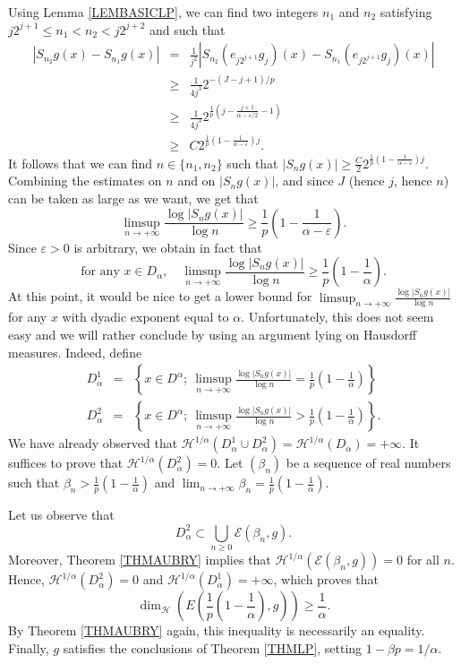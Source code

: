 \documentclass[11pt,a4paper]{amsart}
\theoremstyle{plain}
\begin{document}
Using Lemma \ref{LEMBASICLP}, we can find two integers $n_1$ and $n_2$
satisfying  $j2^{j+1}\le n_1< n_2< j2^{j+2}$ and such that
\begin{eqnarray*}
 |S_{n_2}g(x)-S_{n_1}g(x)|&=&\frac{1}{j^2}|S_{n_2}(e_{j2^{j+1}}g_j)(x)-S_{n_1}(e_{j2^{j+1}}g_j)(x)|\\
 &\geq&\frac{1}{4j^3}2^{-(J-j+1)/p}\\
&\geq&\frac{1}{4j^3}2^{\frac1p\left(j-\frac{j+1}{\alpha-{\varepsilon}/2}-1\right)}\\
&\geq&C2^{\frac1p\left(1-\frac{1}{\alpha-{\varepsilon}}\right)j}.
\end{eqnarray*}
It follows that we can find $n\in\{ n_1,n_2\}$ such that  $|S_{n}g(x)|\ge
\frac{C}2 2^{\frac1p\left(1-\frac{1}{\alpha-{\varepsilon}}\right)j}$. Combining the estimates on $n$ and on $|S_ng(x)|$, and since $J$ (hence $j$, hence $n$) can be taken as large as we want, we get that
$$\limsup_{n\to+\infty}\frac{\log |S_ng(x)|}{\log n}\geq\frac1p\left(1-\frac{1}{\alpha-{\varepsilon}}\right).$$
Since ${\varepsilon}>0$ is arbitrary, we obtain in fact that
$$\textrm{for any }x\in D_\alpha,\quad \limsup_{n\to+\infty}\frac{\log |S_ng(x)|}{\log n}\geq\frac1p\left(1-\frac1\alpha\right).$$
At this point, it would be nice to get a lower bound for
$\displaystyle\limsup_{n\to +\infty} \frac{\log
  |S_ng(x)|}{\log n}$ for any $x$ with dyadic exponent equal to
$\alpha$. Unfortunately, this does not seem
easy and we will rather conclude by using an argument lying on Hausdorff measures. Indeed, define
\begin{eqnarray*}
D_\alpha^1&=&\left\{x\in D^\alpha;\ \limsup_{n\to +\infty} \frac{\log |S_ng(x)|}{\log n}=\frac1p\left(1-\frac{1}{\alpha}\right)\right\}\\
D_\alpha^2&=&\left\{x\in D^\alpha;\ \limsup_{n\to +\infty}\frac{\log |S_ng(x)|}{\log n}>\frac1p\left(1-\frac{1}{\alpha}\right)\right\}.
\end{eqnarray*}
We have already observed that $\mathcal{H}^{1/\alpha}(D_\alpha^1\cup
D_\alpha^2)=\mathcal{H}^{1/\alpha}(D_\alpha)=+\infty$. It suffices 
to prove that $\mathcal{H}^{1/\alpha}(D_\alpha^2)=0$. 
Let $(\beta_n)$ be a sequence of real numbers such that $\displaystyle\beta_n
>\frac1p\left(1-\frac1\alpha\right)$ and $\displaystyle\lim_{n\to
  +\infty}\beta_n=\frac1p\left(1-\frac1\alpha\right)$. 

Let us observe that
$$D_\alpha^2\subset \bigcup_{n\ge 0}\mathcal E(\beta_n,g).$$
Moreover, Theorem \ref{THMAUBRY} implies that  $\mathcal{H}^{1/\alpha}(\mathcal E(\beta_n,g))=0$ for
all $n$. Hence, $\mathcal{H}^{1/\alpha}(D_\alpha^2)=0$ and $\mathcal{H}^{1/\alpha}(D_\alpha^1)=+\infty$, which proves
that
$$\dim_\mathcal{H}\left(E\left(\frac1p\left(1-\frac{1}{\alpha}\right),g\right)\right)
\ge\frac1\alpha.$$
By Theorem \ref{THMAUBRY} again, this inequality is necessarily an equality. 
Finally, $g$ satisfies the conclusions of Theorem \ref{THMLP}, setting $1-\beta p=1/\alpha$.
\end{document}
